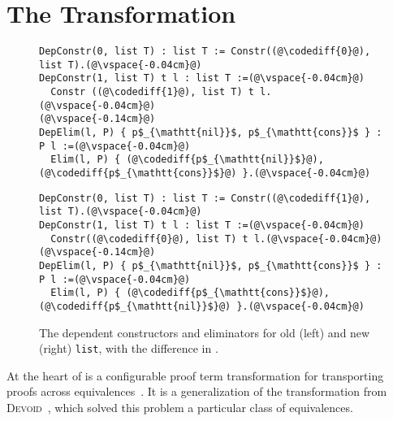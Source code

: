 \section{The Transformation}
\label{sec:key2}

\begin{figure*}
\begin{minipage}{0.48\textwidth}
\begin{lstlisting}
DepConstr(0, list T) : list T := Constr((@\codediff{0}@), list T).(@\vspace{-0.04cm}@)
DepConstr(1, list T) t l : list T :=(@\vspace{-0.04cm}@)
  Constr ((@\codediff{1}@), list T) t l.(@\vspace{-0.04cm}@)
(@\vspace{-0.14cm}@)
DepElim(l, P) { p$_{\mathtt{nil}}$, p$_{\mathtt{cons}}$ } : P l :=(@\vspace{-0.04cm}@)
  Elim(l, P) { (@\codediff{p$_{\mathtt{nil}}$}@), (@\codediff{p$_{\mathtt{cons}}$}@) }.(@\vspace{-0.04cm}@)
\end{lstlisting}
\end{minipage}
\hfill
\begin{minipage}{0.48\textwidth}
\begin{lstlisting}
DepConstr(0, list T) : list T := Constr((@\codediff{1}@), list T).(@\vspace{-0.04cm}@)
DepConstr(1, list T) t l : list T :=(@\vspace{-0.04cm}@)
  Constr((@\codediff{0}@), list T) t l.(@\vspace{-0.04cm}@)
(@\vspace{-0.14cm}@)
DepElim(l, P) { p$_{\mathtt{nil}}$, p$_{\mathtt{cons}}$ } : P l :=(@\vspace{-0.04cm}@)
  Elim(l, P) { (@\codediff{p$_{\mathtt{cons}}$}@), (@\codediff{p$_{\mathtt{nil}}$}@) }.(@\vspace{-0.04cm}@)
\end{lstlisting}
\end{minipage}
\vspace{-0.3cm}
\caption{The dependent constructors and eliminators for old (left) and new (right) \lstinline{list}, with the difference in .}
\vspace{-0.1cm}
\label{fig:listconfig}
\end{figure*}

At the heart of \toolname is a configurable proof term transformation for transporting
proofs across equivalences~. %
It is a generalization of the transformation from 
\textsc{Devoid}~\cite{Ringer2019}, which solved this problem a particular class of equivalences.

